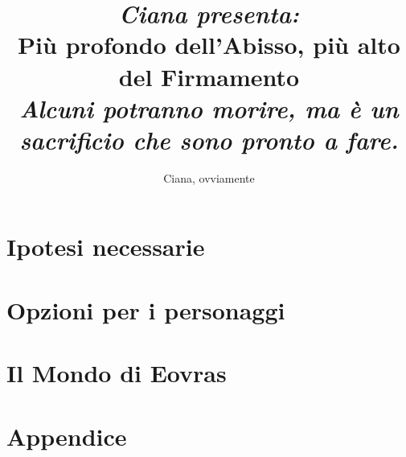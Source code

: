 \documentclass[letterpaper,twocolumn,openany,nodeprecatedcode]{dndbook}
\title{\large{\textit{Ciana presenta:}}\\
    Più profondo dell'Abisso, più alto del Firmamento \\
    \large {\textit{Alcuni potranno morire, ma è un sacrificio che sono pronto a fare.}}
    }
\author{Ciana, ovviamente}
\date{}
\begin{document}
\frontmatter

\maketitle

\tableofcontents

\mainmatter

\part{Ipotesi necessarie}







\part{Opzioni per i personaggi}



%



%



%





%





%













\part{Il Mondo di Eovras}





\part{Appendice}


\end{document}
